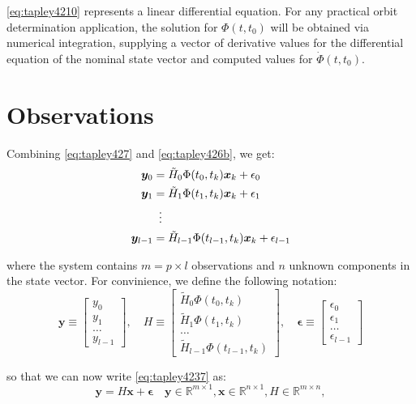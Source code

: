 \ref{eq:tapley4210} represents a linear differential equation. For any practical orbit 
determination application, the solution for \(\Phi (t, t_0)\)  will be obtained
via numerical integration, supplying a vector of derivative values for the differential 
equation of the nominal state vector and computed values for \(\dot{\Phi} (t, t_0)\).

\section{Observations}
Combining \ref{eq:tapley427} and \ref{eq:tapley426b}, we get:
\begin{equation}
  \label{eq:tapley4237}
  \begin{aligned}
    \bm{y}_0 &= \tilde{H}_0 \Phi (t_0, t_k) \bm{x}_k + {\epsilon}_0 \\
    \bm{y}_1 &= \tilde{H}_1 \Phi (t_1, t_k) \bm{x}_k + {\epsilon}_1 \\
    & \vdotswithin{=} \\
    \bm{y}_{l-1} &= \tilde{H}_{l-1} \Phi (t_{l-1}, t_k) \bm{x}_k + {\epsilon}_{l-1}
  \end{aligned}
\end{equation}

where the system contains \(m=p\times l\) observations and \(n\) unknown components 
in the state vector. For convinience, we define the following notation:
\begin{equation}
  \bm{y} \equiv \begin{bmatrix} y_0 \\ y_1 \\ \ldots \\ y_{l-1} \end{bmatrix},
  \quad
  H \equiv \begin{bmatrix} \tilde{H}_0 \Phi (t_0, t_k) \\ \tilde{H}_1 \Phi (t_1, t_k) \\ \ldots \\ \tilde{H}_{l-1} \Phi (t_{l-1}, t_k) \end{bmatrix},
  \quad
  \bm{\epsilon} \equiv \begin{bmatrix} {\epsilon}_0 \\ {\epsilon}_1 \\ \ldots \\ {\epsilon}_{l-1} \end{bmatrix}
\end{equation}

so that we can now write \ref{eq:tapley4237} as:
\begin{equation}
  \label{eq:tapley4239}
  \bm{y} = H \bm{x} + \bm{\epsilon} 
  \quad
  \bm{y} \in \mathbb{R} ^{m \times 1},
  \bm{x} \in \mathbb{R} ^{n \times 1},
  H \in \mathbb{R}^{m \times n},
\end{equation}


